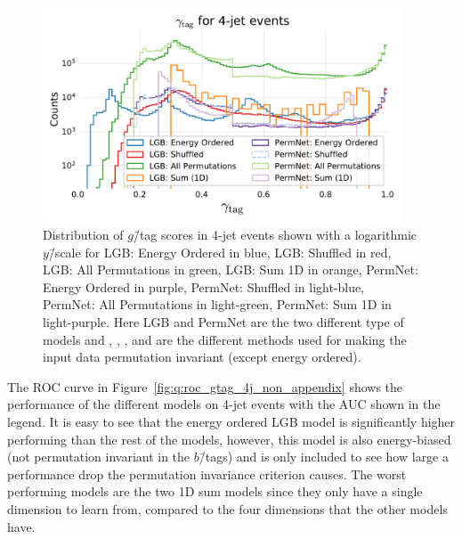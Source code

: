\begin{figure}[ht]
  \centerfloat
  \includegraphics[width=0.95\textwidth, trim=10 10 10 45, clip]{figures/quarks/gtag_y_pred_4_jet_hist-down_sample=1.00-ML_vars=vertex-selection=b-ejet_min=4-n_iter_RS_lgb=99-n_iter_RS_xgb=9-cdot_cut=0.90-version=19.pdf}
  \caption[$g$\=/Tag Scores in 4-Jet Events]
          {Distribution of $g$\=/tag scores in 4-jet events shown with a logarithmic $y$\=/scale for LGB: Energy Ordered in blue, LGB: Shuffled in red, LGB: All Permutations in green, LGB: Sum 1D in orange, PermNet: Energy Ordered in purple, PermNet: Shuffled in light-blue, PermNet: All Permutations in light-green, PermNet: Sum 1D in light-purple.  Here LGB and PermNet are the two different type of models and , , , and  are the different methods used for making the input data permutation invariant (except energy ordered).}   
  \label{fig:q:gtag_scores_4j}
\end{figure}
\vspace{-3mm}

The ROC curve in Figure~\ref{fig:q:roc_gtag_4j_non_appendix} shows the performance of the different models on 4-jet events with the AUC shown in the legend. It is easy to see that the energy ordered LGB model is significantly higher performing than the rest of the models, however, this model is also energy-biased (not permutation invariant in the $b$\=/tags) and is only included to see how large a performance drop the permutation invariance criterion causes. The worst performing models are the two 1D sum models since they only have a single dimension to learn from, compared to the four dimensions that the other models have. 


